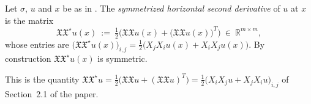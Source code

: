 \begin{definition}
Let $\sigma$, $u$ and $x$ be as in . The \emph{symmetrized horizontal second
derivative} of $u$ at $x$ is the matrix
$$\mathfrak{X}\mathfrak{X}^\star u(x)\ :=\ \tfrac{1}{2}\Big(\mathfrak{X}\mathfrak{X}u(x)+
\big(\mathfrak{X}\mathfrak{X}u(x)\big)^T\Big)\ \in\ \mathbb{R}^{m\times m},$$
whose entries are
$\big(\mathfrak{X}\mathfrak{X}^\star u(x)\big)_{i,j}=\tfrac12\big(X_jX_iu(x)+X_iX_ju(x)\big)$.
By construction $\mathfrak{X}\mathfrak{X}^\star u(x)$ is symmetric.

This is the quantity
$\mathfrak{X}\mathfrak{X}^\star u=\tfrac12\big(\mathfrak{X}\mathfrak{X}u+(\mathfrak{X}\mathfrak{X}
u)^T\big)=\tfrac12\big(X_iX_ju+X_jX_iu\big)_{i,j}$ of Section~2.1 of the paper.
\end{definition}
